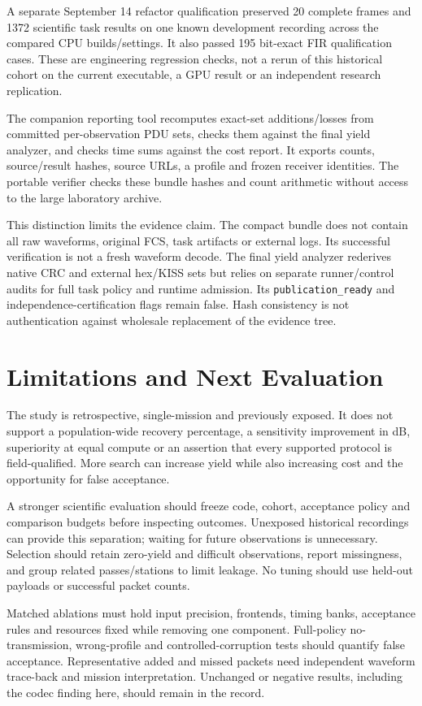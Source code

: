 \documentclass[journal]{IEEEtran}
\newcommand{\code}[1]{\texttt{#1}}
\begin{document}
A separate September 14 refactor qualification preserved 20 complete frames and 1372 scientific task results on one known development recording across the compared CPU builds/settings. It also passed 195 bit-exact FIR qualification cases. These are engineering regression checks, not a rerun of this historical cohort on the current executable, a GPU result or an independent research replication.

The companion reporting tool recomputes exact-set additions/losses from committed per-observation PDU sets, checks them against the final yield analyzer, and checks time sums against the cost report. It exports counts, source/result hashes, source URLs, a profile and frozen receiver identities. The portable verifier checks these bundle hashes and count arithmetic without access to the large laboratory archive.

This distinction limits the evidence claim. The compact bundle does not contain all raw waveforms, original FCS, task artifacts or external logs. Its successful verification is not a fresh waveform decode. The final yield analyzer rederives native CRC and external hex/KISS sets but relies on separate runner/control audits for full task policy and runtime admission. Its \code{publication\_ready} and independence-certification flags remain false. Hash consistency is not authentication against wholesale replacement of the evidence tree.

\section{Limitations and Next Evaluation}
The study is retrospective, single-mission and previously exposed. It does not support a population-wide recovery percentage, a sensitivity improvement in dB, superiority at equal compute or an assertion that every supported protocol is field-qualified. More search can increase yield while also increasing cost and the opportunity for false acceptance.

A stronger scientific evaluation should freeze code, cohort, acceptance policy and comparison budgets before inspecting outcomes. Unexposed historical recordings can provide this separation; waiting for future observations is unnecessary. Selection should retain zero-yield and difficult observations, report missingness, and group related passes/stations to limit leakage. No tuning should use held-out payloads or successful packet counts.

Matched ablations must hold input precision, frontends, timing banks, acceptance rules and resources fixed while removing one component. Full-policy no-transmission, wrong-profile and controlled-corruption tests should quantify false acceptance. Representative added and missed packets need independent waveform trace-back and mission interpretation. Unchanged or negative results, including the codec finding here, should remain in the record.
\end{document}
